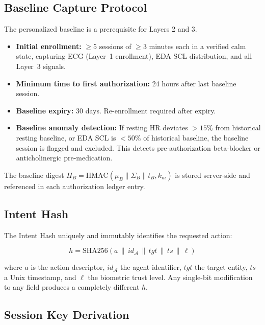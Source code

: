 \documentclass[12pt,a4paper]{article}
\begin{document}
\subsection{Baseline Capture Protocol}
\label{sec:baseline}

The personalized baseline is a prerequisite for Layers 2 and 3.

\begin{itemize}
  \item \textbf{Initial enrollment:} $\geq 5$ sessions of $\geq 3$ minutes
  each in a verified calm state, capturing ECG (Layer~1 enrollment), EDA SCL
  distribution, and all Layer~3 signals.
  \item \textbf{Minimum time to first authorization:} 24 hours after last
  baseline session.
  \item \textbf{Baseline expiry:} 30 days. Re-enrollment required after
  expiry.
  \item \textbf{Baseline anomaly detection:} If resting HR deviates $>15\%$
  from historical resting baseline, or EDA SCL is $<50\%$ of historical
  baseline, the baseline session is flagged and excluded. This detects
  pre-authorization beta-blocker or anticholinergic pre-medication.
\end{itemize}

The baseline digest $H_B = \text{HMAC}(\mu_B \| \Sigma_B \| t_B, k_m)$ is
stored server-side and referenced in each authorization ledger entry.

\subsection{Intent Hash}
\label{sec:intent-hash}

The Intent Hash uniquely and immutably identifies the requested action:

\begin{equation}
h = \text{SHA256}(a \,\|\, id_{\mathcal{A}} \,\|\, tgt \,\|\, ts \,\|\, \ell)
\end{equation}

where $a$ is the action descriptor, $id_{\mathcal{A}}$ the agent identifier,
$tgt$ the target entity, $ts$ a Unix timestamp, and $\ell$ the biometric
trust level. Any single-bit modification to any field produces a completely
different $h$.

\subsection{Session Key Derivation}
\end{document}
